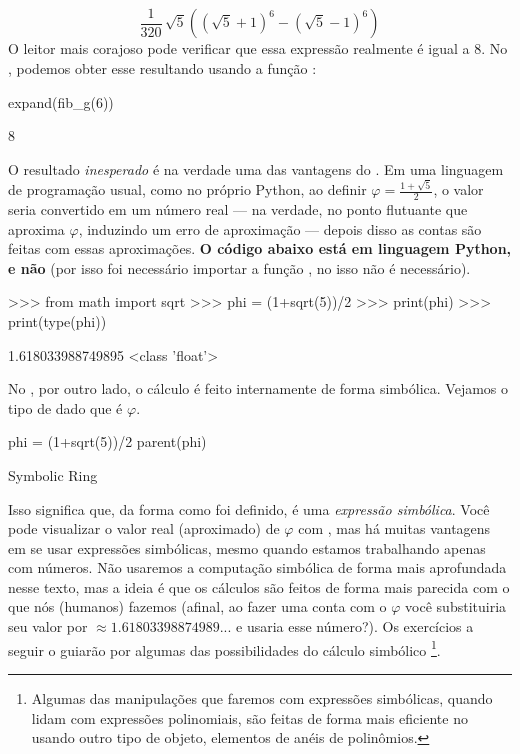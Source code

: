 $$
\newcommand{\Bold}[1]{\mathbf{#1}}\frac{1}{320} \, \sqrt{5}
  {\left({\left(\sqrt{5} + 1\right)}^{6} - {\left(\sqrt{5} - 1\right)}^{6}\right)}
$$
O leitor mais corajoso pode verificar que essa expressão
realmente é igual a $8$. No \sage, podemos obter
esse resultando usando a função :
\begin{sageinput}
expand(fib_g(6))
\end{sageinput}
\begin{sageoutput}
8
\end{sageoutput}
O resultado \emph{inesperado} é na verdade uma das
vantagens do \sage. Em uma linguagem de programação usual,
como no próprio Python, ao definir 
$\varphi = \frac{1+\sqrt{5}}{2}$, o valor seria convertido
em um número real --- na verdade, no ponto flutuante
que aproxima $\varphi$, induzindo um erro de aproximação ---
depois disso as contas são feitas com essas aproximações.
\textbf{O código abaixo está em linguagem Python, e não
\sage} (por isso foi necessário importar a função ,
no \sage isso não é necessário).
\begin{sageinput}
>>> from math import sqrt
>>> phi = (1+sqrt(5))/2
>>> print(phi)
>>> print(type(phi))
\end{sageinput}
\begin{sageoutput}
1.618033988749895
<class 'float'>
\end{sageoutput}
No \sage, por outro lado, o cálculo é feito internamente de
forma simbólica.
Vejamos o tipo de dado que é $\varphi$.
\begin{sageinput}
phi = (1+sqrt(5))/2
parent(phi)                                                                                        
\end{sageinput}
\begin{sageoutput}
Symbolic Ring
\end{sageoutput}
Isso significa que, da forma como foi definido,
 é uma \emph{expressão simbólica}. Você
pode visualizar o valor real (aproximado) de 
$\varphi$ com  , mas
há muitas vantagens em se usar expressões simbólicas,
mesmo quando estamos trabalhando apenas com números.
Não usaremos a computação simbólica de forma mais
aprofundada nesse texto, mas a ideia é que os
cálculos são feitos de forma mais parecida com o que nós
(humanos) fazemos (afinal, ao fazer uma conta com 
o $\varphi$ você substituiria seu valor por
$\approx 1.61803398874989...$ e usaria esse número?).
Os exercícios a seguir o guiarão por algumas das
possibilidades do cálculo simbólico
\footnote{Algumas das manipulações
que faremos com expressões simbólicas, quando lidam com expressões
polinomiais, são feitas de forma mais eficiente no
\sage usando outro tipo de objeto, elementos
de anéis de polinômios.}.

